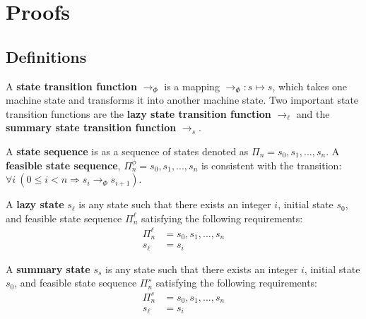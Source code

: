 \section{Proofs}

\subsection{Definitions}

\begin{definition}
A \textbf{state transition function} $\rightarrow_{\Phi}$ is a mapping $\rightarrow_{\Phi} : s \mapsto s$, which takes one machine state and transforms it into another machine state. Two important state transition functions are the \textbf{lazy state transition function} $\rightarrow_\ell$ and the \textbf{summary state transition function} $\rightarrow_s$.
\end{definition}

\begin{definition}
A \textbf{state sequence} is as a sequence of states denoted as $\Pi_n = s_0,s_1,...,s_n$. A \textbf{feasible state sequence}, $\Pi_n^\phi = s_0,s_1,...,s_n$ is consistent with the transition: $\forall i\ (0 \leq i < n \Rightarrow s_i \rightarrow_{\Phi} s_{i+1})$.
\end{definition}

\begin{comment}
\begin{definition}
A \textbf{feasible state sequence} is defined as a sequence of states resulting from repeated application of the state transition relation to some initial state $s_0$: $$\Pi_n = s_0,s_1,...,s_n$$ where the relation $s_i \rightarrow_{\Phi} s_{i+1}$ holds for all $i \in \{ i | 0 \leq i < n \}$
\end{definition}
\end{comment}

\begin{definition}
A \textbf{lazy state} $s_\ell$ is any state such that there exists an integer $i$, initial state $s_0$, and feasible state sequence $\Pi_n^\ell$ satisfying the following requirements:
\begin{align}
\Pi_n^\ell &= s_0,s_1,...,s_n\\
s_\ell &= s_i
\end{align}
\end{definition}

\begin{definition}
A \textbf{summary state} $s_s$ is any state such that there exists an integer $i$, initial state $s_0$, and feasible state sequence $\Pi_n^s$ satisfying the following requirements:
\begin{align}
\Pi_n^s &= s_0,s_1,...,s_n\\
s_\ell &= s_i
\end{align}
\end{definition}

